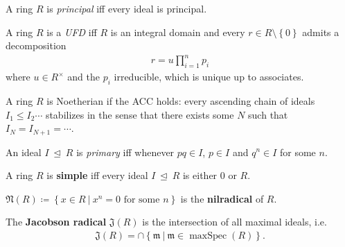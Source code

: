 \begin{definition}

A ring \(R\) is \emph{principal} iff every ideal is principal.

\end{definition}

\begin{definition}

A ring \(R\) is a \emph{UFD} iff \(R\) is an integral domain and every
\(r\in R\setminus\left\{{0}\right\}\) admits a decomposition
\begin{align*}  
r = u \prod_{i=1}^n p_i
\end{align*}
where \(u\in R^{\times}\) and the \(p_i\) irreducible, which is unique
up to associates.

\end{definition}

\begin{definition}[Noetherian]

A ring \(R\) is Noetherian if the ACC holds: every ascending chain of
ideals \(I_1 \leq I_2 \cdots\) stabilizes in the sense that there exists
some \(N\) such that \(I_N = I_{N+1} = \cdots\).

\end{definition}

\begin{definition}

An ideal \(I{~\trianglelefteq~}R\) is \emph{primary} iff whenever
\(pq\in I\), \(p\in I\) and \(q^n\in I\) for some \(n\).

\end{definition}

\begin{definition}

A ring \(R\) is \textbf{simple} iff every ideal
\(I {~\trianglelefteq~}R\) is either \(0\) or \(R\).

\end{definition}

\begin{definition}[Nilradical]

\({\mathfrak{N}}(R) \coloneqq\left\{{x\in R {~\mathrel{\Big|}~}x^n=0\text{ for some } n}\right\}\)
is the \textbf{nilradical} of \(R\).

\end{definition}

\begin{definition}

The \textbf{Jacobson radical} \({\mathfrak{J}}(R)\) is the intersection
of all maximal ideals, i.e.
\begin{align*}  
{\mathfrak{J}}(R) = \cap\left\{{{\mathfrak{m}}{~\mathrel{\Big|}~}{\mathfrak{m}}\in {\operatorname{maxSpec}}(R) }\right\}
.\end{align*}

\end{definition}

